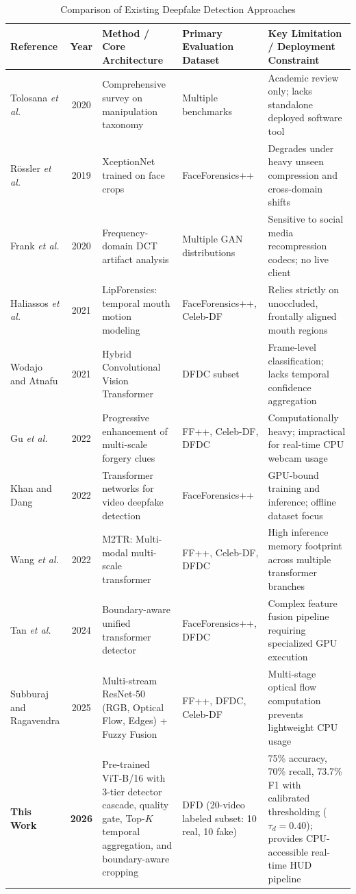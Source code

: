 \documentclass[conference]{IEEEtran}
\begin{document}
\begin{table}[t]
\caption{Comparison of Existing Deepfake Detection Approaches}
\label{tab:related}
\centering
\scriptsize
\setlength{\tabcolsep}{3.5pt}
\begin{tabular}{|l|c|p{4.2cm}|p{3.2cm}|p{5.0cm}|}
\hline
\textbf{Reference} & \textbf{Year} & \textbf{Method / Core Architecture} & \textbf{Primary Evaluation Dataset} & \textbf{Key Limitation / Deployment Constraint} \\
\hline
Tolosana \textit{et al.} \cite{tolosana2020} & 2020 & Comprehensive survey on manipulation taxonomy & Multiple benchmarks & Academic review only; lacks standalone deployed software tool \\
\hline
R{\"o}ssler \textit{et al.} \cite{rossler2019} & 2019 & XceptionNet trained on face crops & FaceForensics++ & Degrades under heavy unseen compression and cross-domain shifts \\
\hline
Frank \textit{et al.} \cite{frank2020} & 2020 & Frequency-domain DCT artifact analysis & Multiple GAN distributions & Sensitive to social media recompression codecs; no live client \\
\hline
Haliassos \textit{et al.} \cite{haliassos2021} & 2021 & LipForensics: temporal mouth motion modeling & FaceForensics++, Celeb-DF & Relies strictly on unoccluded, frontally aligned mouth regions \\
\hline
Wodajo and Atnafu \cite{wodajo2021} & 2021 & Hybrid Convolutional Vision Transformer & DFDC subset & Frame-level classification; lacks temporal confidence aggregation \\
\hline
Gu \textit{et al.} \cite{gu2022} & 2022 & Progressive enhancement of multi-scale forgery clues & FF++, Celeb-DF, DFDC & Computationally heavy; impractical for real-time CPU webcam usage \\
\hline
Khan and Dang \cite{khan2022} & 2022 & Transformer networks for video deepfake detection & FaceForensics++ & GPU-bound training and inference; offline dataset focus \\
\hline
Wang \textit{et al.} \cite{wang2023} & 2022 & M2TR: Multi-modal multi-scale transformer & FF++, Celeb-DF, DFDC & High inference memory footprint across multiple transformer branches \\
\hline
Tan \textit{et al.} \cite{tan2024} & 2024 & Boundary-aware unified transformer detector & FaceForensics++, DFDC & Complex feature fusion pipeline requiring specialized GPU execution \\
\hline
Subburaj and Ragavendra \cite{subburaj2025} & 2025 & Multi-stream ResNet-50 (RGB, Optical Flow, Edges) + Fuzzy Fusion & FF++, DFDC, Celeb-DF & Multi-stage optical flow computation prevents lightweight CPU usage \\
\hline
\textbf{This Work} & \textbf{2026} & Pre-trained ViT-B/16 with 3-tier detector cascade, quality gate, Top-$K$ temporal aggregation, and boundary-aware cropping & DFD (20-video labeled subset: 10 real, 10 fake) & 75\% accuracy, 70\% recall, 73.7\% F1 with calibrated thresholding ($\tau_d = 0.40$); provides CPU-accessible real-time HUD pipeline \\
\hline
\end{tabular}
\end{table}
\end{document}
